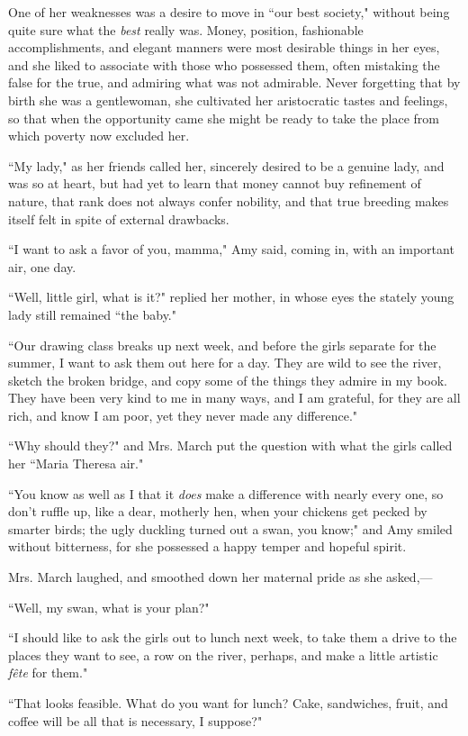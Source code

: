 One of her weaknesses was a desire to move in ``our best society,"
without being quite sure what the \emph{best} really was. Money,
position, fashionable accomplishments, and elegant manners were most
desirable things in her eyes, and she liked to associate with those who
possessed them, often mistaking the false for the true, and admiring
what was not admirable. Never forgetting that by birth she was a
gentlewoman, she cultivated her aristocratic tastes and feelings, so
that when the opportunity came she might be ready to take the place from
which poverty now excluded her.

``My lady," as her friends called her, sincerely desired to be a genuine
lady, and was so at heart, but had yet to learn that money cannot buy
refinement of nature, that rank does not always confer nobility, and
that true breeding makes itself felt in spite of external drawbacks.

``I want to ask a favor of you, mamma," Amy said, coming in, with an
important air, one day.

``Well, little girl, what is it?" replied her mother, in whose eyes the
stately young lady still remained ``the baby."

``Our drawing class breaks up next week, and before the girls separate
for the summer, I want to ask them out here for a day. They are wild to
see the river, sketch the broken bridge, and copy some of the things
they admire in my book. They have been very kind to me in many ways, and
I am grateful, for they are all rich, and know I am poor, yet they never
made any difference."

``Why should they?" and Mrs. March put the question with what the girls
called her ``Maria Theresa air."

``You know as well as I that it \emph{does} make a difference with nearly
every one, so don't ruffle up, like a dear, motherly
hen, when your chickens get pecked by smarter birds; the ugly duckling
turned out a swan, you know;" and Amy smiled without bitterness, for she
possessed a happy temper and hopeful spirit.

Mrs. March laughed, and smoothed down her maternal pride as she
asked,---

``Well, my swan, what is your plan?"

``I should like to ask the girls out to lunch next week, to take them a
drive to the places they want to see, a row on the river, perhaps, and
make a little artistic \emph{fête} for them."

``That looks feasible. What do you want for lunch? Cake, sandwiches,
fruit, and coffee will be all that is necessary, I suppose?"

